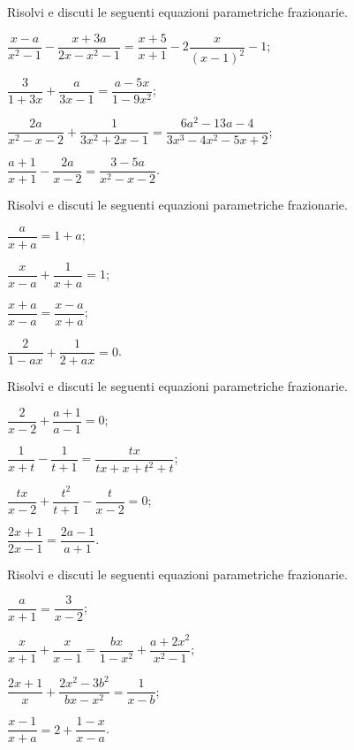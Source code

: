 \begin{esercizio}[\Ast]
\label{ese:19.16}
Risolvi e discuti le seguenti equazioni parametriche frazionarie.
\begin{enumeratea}
 \item $\dfrac{x-a}{x^{2}-1}-\dfrac{x+3a}{2x-x^{2}-1}=\dfrac{x+5}{x+1}-2\dfrac{x}{(x-1)^{2}}-1$;
 \item $\dfrac{3}{1+3x}+\dfrac{a}{3x-1}=\dfrac{a-5x}{1-9x^{2}}$;
 \item $\dfrac{2a}{x^{2}-x-2}+\dfrac{1}{3x^{2}+2x-1}=\dfrac{6a^{2}-13a-4}{3x^{3}-4x^{2}-5x+2}$;
 \item $\dfrac{a+1}{x+1}-\dfrac{2a}{x-2}=\dfrac{3-5a}{x^{2}-x-2}$.
\end{enumeratea}
\end{esercizio}

\begin{esercizio}[\Ast]
\label{ese:19.17}
Risolvi e discuti le seguenti equazioni parametriche frazionarie.
\begin{multicols}{2}
\begin{enumeratea}
 \item $\dfrac{a}{x+a}=1+a$;
 \item $\dfrac{x}{x-a}+\dfrac{1}{x+a}=1$;
 \item $\dfrac{x+a}{x-a}=\dfrac{x-a}{x+a}$;
 \item $\dfrac{2}{1-ax}+\dfrac{1}{2+ax}=0$.
\end{enumeratea}
\end{multicols}
\end{esercizio}

\begin{esercizio}[\Ast]
\label{ese:19.18}
Risolvi e discuti le seguenti equazioni parametriche frazionarie.
\begin{multicols}{2}
\begin{enumeratea}
 \item $\dfrac{2}{x-2}+\dfrac{a+1}{a-1}=0$;
 \item $\dfrac{1}{x+t}-\dfrac{1}{t+1}=\dfrac{tx}{tx+x+t^{2}+t}$;
 \item $\dfrac{tx}{x-2}+\dfrac{t^{2}}{t+1}-\dfrac{t}{x-2}=0$;
 \item $\dfrac{2x+1}{2x-1}=\dfrac{2a-1}{a+1}$.
\end{enumeratea}
\end{multicols}
\end{esercizio}

\begin{esercizio}
\label{ese:19.19}
Risolvi e discuti le seguenti equazioni parametriche frazionarie.
\begin{multicols}{2}
\begin{enumeratea}
 \item $\dfrac{a}{x+1}=\dfrac{3}{x-2}$;
 \item $\dfrac{x}{x+1}+\dfrac{x}{x-1}=\dfrac{bx}{1-x^{2}}+\dfrac{a+2x^{2}}{x^{2}-1}$;
 \item $\dfrac{2x+1}{x}+\dfrac{2x^{2}-3b^{2}}{bx-x^{2}}=\dfrac{1}{x-b}$;
 \item $\dfrac{x-1}{x+a}=2+\dfrac{1-x}{x-a}$.
\end{enumeratea}
\end{multicols}
\end{esercizio}

